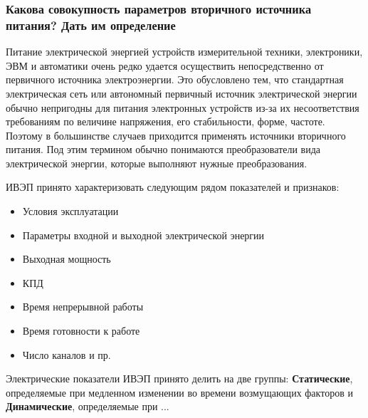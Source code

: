 \subsubsection{Какова совокупность параметров вторичного источника питания? Дать им определение}

Питание электрической энергией устройств измерительной техники, электроники, ЭВМ и автоматики очень редко удается осуществить непосредственно от первичного источника электроэнергии. Это обусловлено тем, что стандартная электрическая сеть или автономный первичный источник электрической энергии обычно непригодны для питания электронных устройств из-за их несоответствия требованиям по величине напряжения, его стабильности, форме, частоте. Поэтому в большинстве случаев приходится применять источники вторичного питания. Под этим термином обычно понимаются преобразователи вида электрической энергии, которые выполняют нужные преобразования.

ИВЭП принято характеризовать следующим рядом показателей и признаков:
\begin{itemize}
\item Условия эксплуатации
\item Параметры входной и выходной электрической энергии
\item Выходная мощность
\item КПД
\item Время непрерывной работы
\item Время готовности к работе
\item Число каналов и пр.
\end{itemize}

Электрические показатели ИВЭП принято делить на две группы: \textbf{Статические}, определяемые при медленном изменении во времени возмущающих факторов и \textbf{Динамические}, определяемые при ...

